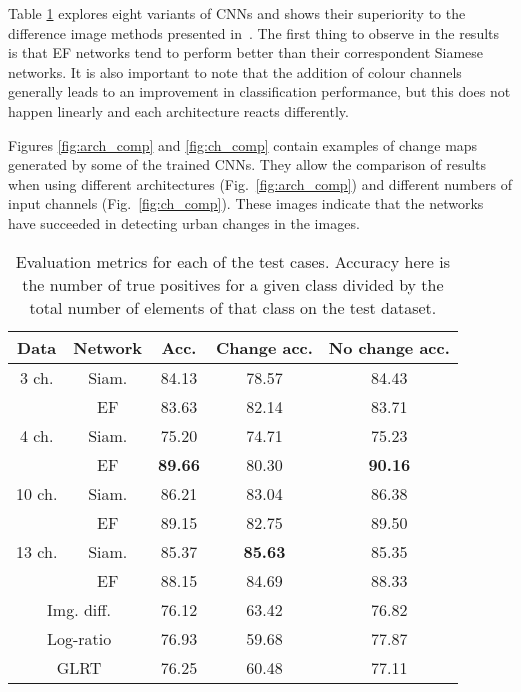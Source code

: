 \documentclass{article}
\begin{document}
Table \ref{tab:results} explores eight variants of CNNs and shows their superiority to the difference image methods presented in~\cite{le2013urban}.
The first thing to observe in the results is that EF networks tend to perform better than their correspondent Siamese networks. It is also important to note that the addition of colour channels generally leads to an improvement in classification performance, but this does not happen linearly and each architecture reacts differently.


Figures \ref{fig:arch_comp} and \ref{fig:ch_comp} contain examples of change maps generated by some of the trained CNNs. They allow the comparison of results when using different architectures (Fig.~\ref{fig:arch_comp}) and different numbers of input channels (Fig.~\ref{fig:ch_comp}). These images indicate that the networks have succeeded in detecting urban changes in the images.


\begin{table}
\begin{tabular}{cc|c|c|c}

Data & Network & Acc. & Change acc. & No change acc.\\
\hline \hline
 3 ch. & Siam.      & 84.13 & 78.57 & 84.43 \\
       & EF         & 83.63 & 82.14 & 83.71 \\  \hline
 4 ch. & Siam.      & 75.20 & 74.71 & 75.23 \\
       & EF         &  \cellcolor{ForestGreen!35}\textbf{89.66} & 80.30 & \cellcolor{ForestGreen!35}\textbf{90.16} \\  \hline
10 ch. & Siam.      & 86.21 & \cellcolor{GreenYellow!35}83.04 & 86.38 \\
       & EF         & \cellcolor{YellowGreen!35}89.15 & 82.75 & \cellcolor{YellowGreen!35}89.50 \\  \hline
13 ch. & Siam.      & 85.37 & \cellcolor{ForestGreen!35}\textbf{85.63} & 85.35 \\
       & EF         & \cellcolor{GreenYellow!35}88.15 & \cellcolor{YellowGreen!35}84.69 & \cellcolor{GreenYellow!35}88.33 \\  \hline \hline
 \multicolumn{2}{c|}{Img. diff.} & 76.12 & 63.42 & 76.82 \\ 
    \multicolumn{2}{c|}{Log-ratio} & 76.93 & 59.68 & 77.87 \\ 
    \multicolumn{2}{c|}{GLRT}    & 76.25 & 60.48 & 77.11 \\  \hline
\end{tabular}
\caption{Evaluation metrics for each of the test cases. Accuracy here is the number of true positives for a given class divided by the total number of elements of that class on the test dataset.}
\label{tab:results}
\end{table}
\end{document}
